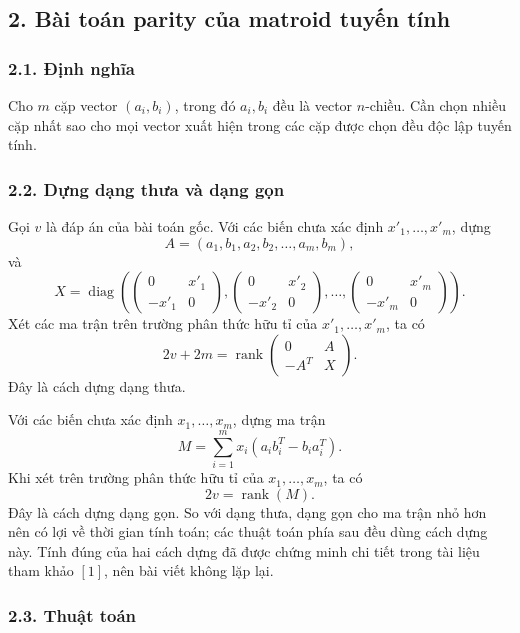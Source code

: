 \documentclass[11pt]{article}
\begin{document}
\subsection*{2. Bài toán parity của matroid tuyến tính}

\subsubsection*{2.1. Định nghĩa}

Cho \(m\) cặp vector \((a_i,b_i)\), trong đó \(a_i,b_i\) đều là vector
\(n\)-chiều. Cần chọn nhiều cặp nhất sao cho mọi vector xuất hiện trong các cặp
được chọn đều độc lập tuyến tính.

\subsubsection*{2.2. Dựng dạng thưa và dạng gọn}

Gọi \(v\) là đáp án của bài toán gốc. Với các biến chưa xác định
\(x'_1,\ldots,x'_m\), dựng
\[
  A=(a_1,b_1,a_2,b_2,\ldots,a_m,b_m),
\]
và
\[
  X=\operatorname{diag}\left(
  \begin{pmatrix}0&x'_1\\-x'_1&0\end{pmatrix},
  \begin{pmatrix}0&x'_2\\-x'_2&0\end{pmatrix},
  \ldots,
  \begin{pmatrix}0&x'_m\\-x'_m&0\end{pmatrix}\right).
\]
Xét các ma trận trên trường phân thức hữu tỉ của \(x'_1,\ldots,x'_m\), ta có
\[
  2v+2m=\operatorname{rank}
  \begin{pmatrix}
    0&A\\
    -A^T&X
  \end{pmatrix}.
\]
Đây là cách dựng dạng thưa.

Với các biến chưa xác định \(x_1,\ldots,x_m\), dựng ma trận
\[
  M=\sum_{i=1}^{m}x_i(a_ib_i^T-b_ia_i^T).
\]
Khi xét trên trường phân thức hữu tỉ của \(x_1,\ldots,x_m\), ta có
\[
  2v=\operatorname{rank}(M).
\]
Đây là cách dựng dạng gọn. So với dạng thưa, dạng gọn cho ma trận nhỏ hơn nên
có lợi về thời gian tính toán; các thuật toán phía sau đều dùng cách dựng này.
Tính đúng của hai cách dựng đã được chứng minh chi tiết trong tài liệu tham khảo
\([1]\), nên bài viết không lặp lại.

\subsubsection*{2.3. Thuật toán}
\end{document}
